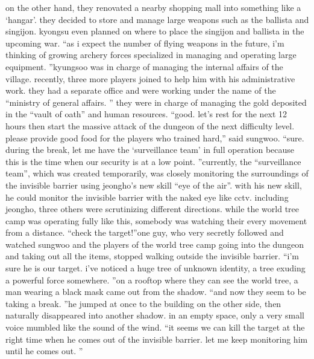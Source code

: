 on the other hand, they renovated a nearby shopping mall into something like a ‘hangar’.
they decided to store and manage large weapons such as the ballista and singijon.
kyongsu even planned on where to place the singijon and ballista in the upcoming war.
“as i expect the number of flying weapons in the future, i’m thinking of growing archery forces specialized in managing and operating large equipment.
”kyungsoo was in charge of managing the internal affairs of the village.
 recently, three more players joined to help him with his administrative work.
they had a separate office and were working under the name of the “ministry of general affairs.
” they were in charge of managing the gold deposited in the “vault of oath” and human resources.
“good.
 let’s rest for the next 12 hours then start the massive attack of the dungeon of the next difficulty level.
 please provide good food for the players who trained hard,” said sungwoo.
“sure.
 during the break, let me have the ‘surveillance team’ in full operation because this is the time when our security is at a low point.
”currently, the “surveillance team”, which was created temporarily, was closely monitoring the surroundings of the invisible barrier using jeongho’s new skill “eye of the air”.
with his new skill, he could monitor the invisible barrier with the naked eye like cctv.
 including jeongho, three others were scrutinizing different directions.
while the world tree camp was operating fully like this, somebody was watching their every movement from a distance.
“check the target!”one guy, who very secretly followed and watched sungwoo and the players of the world tree camp going into the dungeon and taking out all the items, stopped walking outside the invisible barrier.
“i’m sure he is our target.
 i’ve noticed a huge tree of unknown identity, a tree exuding a powerful force somewhere.
”on a rooftop where they can see the world tree, a man wearing a black mask came out from the shadow.
“and now they seem to be taking a break.
”he jumped at once to the building on the other side, then naturally disappeared into another shadow.
in an empty space, only a very small voice mumbled like the sound of the wind.
“it seems we can kill the target at the right time when he comes out of the invisible barrier.
 let me keep monitoring him until he comes out.
”

 